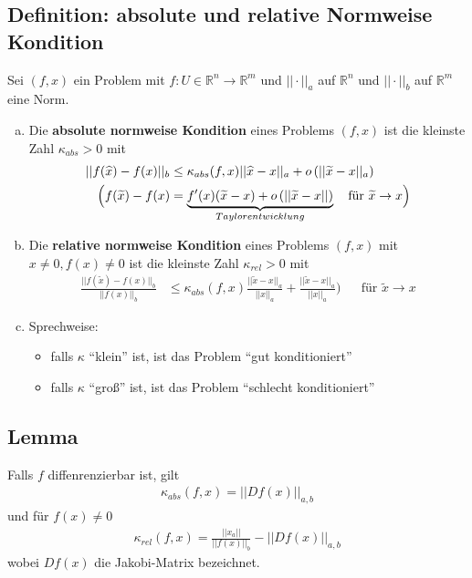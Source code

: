 \documentclass[ngerman,fontsize=11pt, paper=a4, parskip=false, titlepage=false, toc=bib]{scrbook}
\newcommand{\R}{\mathbb{R}}
\begin{document}
\subsection{Definition: absolute und relative Normweise Kondition}
Sei $(f,x)$ ein Problem mit $f:U\in\R^n \rightarrow \R^m$
und $||\cdot||_a$ auf $\R^n$ und $||\cdot||_b$ auf $\R^m$ eine Norm.
\begin{enumerate}[a)]
	\item Die \textbf{absolute normweise Kondition} eines Problems $(f,x)$ ist die kleinste Zahl 
			 $\kappa _{abs} > 0 $ mit
			 \begin{align}
			 	||f(\widehat{x})-f(x)||_b &\leq \kappa _{abs}(f,x) ||\widehat{x}-x||_a
			 	+ o\left(||\widetilde{x}-x||_a\right) \label{III.2.2} \\\nonumber
			 	\Bigl(f(\widetilde{x})- f(x) 
						 	&=\underbrace{ f'(x)(\widetilde{x}-x)+ o\left(||\widetilde{x}-x||\right)}_{Taylorentwicklung}
							 \quad \text{für }\widetilde{x}\rightarrow x 
						 	\Bigr)
			 \end{align}
	\item Die \textbf{relative normweise Kondition} eines Problems $(f,x)$  mit $x\neq 0, f(x) \neq 0$
			 	ist die kleinste Zahl 
			 	$\kappa _{rel} > 0 $ mit
			 	\begin{align}
			 \frac{	||f(\widetilde{x})-f(x)||_b }{||f(x)||_b}
				 &\leq \kappa _{abs}(f,x)\frac{ ||\widetilde{x}-x||_a}{||x||_a}
			 	+ 
			 	\frac{||\widetilde{x}-x||_a}{||x||_a}) \label{III.2.3}
					 &&	\text{für } \widetilde{x} \rightarrow x
			 	\end{align}
	\item Sprechweise:
		\begin{itemize}
			\item falls $\kappa$ \enquote{klein} ist, ist das Problem \enquote{gut konditioniert}
			\item falls $\kappa$ \enquote{groß} ist, ist das Problem \enquote{schlecht konditioniert}
		\end{itemize}
\end{enumerate}

\subsection{Lemma} \label{3.2.8}
Falls $f$ diffenrenzierbar ist, gilt
\begin{gather}
	\kappa_{abs}(f,x) = ||Df(x)||_{a,b} \label{III.2.4}
\end{gather}
und für $f(x) \neq 0$
\begin{gather}
	\kappa_{rel}(f,x) = \frac{||x_a||}{||f(x)||_b} -||Df(x)||_{a,b} \label{III.2.5}
\end{gather}
wobei $Df(x)$ die Jakobi-Matrix bezeichnet.
%
\end{document}
